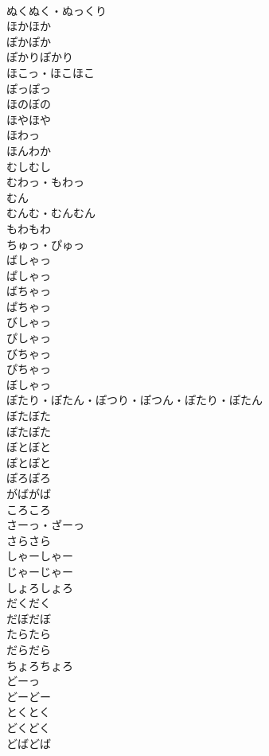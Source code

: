 \documentclass[8pt]{extreport}
\begin{document}
\begin{CJK}{UTF8}{min}
\\	ぬくぬく・ぬっくり	
\\	ほかほか	
\\	ぽかぽか	
\\	ぽかりぽかり	
\\	ほこっ・ほこほこ	
\\	ぽっぽっ	
\\	ほのぼの	
\\	ほやほや	
\\	ほわっ	
\\	ほんわか	
\\	むしむし	
\\	むわっ・もわっ	
\\	むん	
\\	むんむ・むんむん	
\\	もわもわ	
\\	ちゅっ・ぴゅっ	
\\	ばしゃっ	
\\	ぱしゃっ	
\\	ばちゃっ	
\\	ぱちゃっ	
\\	びしゃっ	
\\	ぴしゃっ	
\\	びちゃっ	
\\	ぴちゃっ	
\\	ぼしゃっ	
\\	ぽたり・ぽたん・ぽつり・ぽつん・ぽたり・ぽたん	
\\	ぼたぼた	
\\	ぽたぽた	
\\	ぼとぼと	
\\	ぽとぽと	
\\	ぽろぽろ	
\\	がばがば	
\\	ころころ	
\\	さーっ・ざーっ	
\\	さらさら	
\\	しゃーしゃー	
\\	じゃーじゃー	
\\	しょろしょろ	
\\	だくだく	
\\	だぼだぼ	
\\	たらたら	
\\	だらだら	
\\	ちょろちょろ	
\\	どーっ	
\\	どーどー	
\\	とくとく	
\\	どくどく	
\\	どばどば	

\end{CJK}
\end{document}
